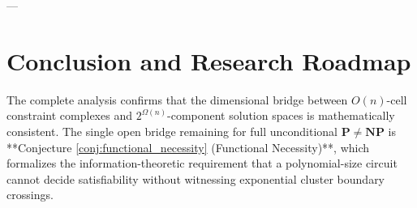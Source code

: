 \documentclass[11pt,a4paper]{article}
\theoremstyle{plain}
\theoremstyle{definition}
\theoremstyle{remark}
\begin{document}
---

\section{Conclusion and Research Roadmap}

The complete analysis confirms that the dimensional bridge between $O(n)$-cell constraint complexes and $2^{\Omega(n)}$-component solution spaces is mathematically consistent. The single open bridge remaining for full unconditional $\mathbf{P} \neq \mathbf{NP}$ is **Conjecture \ref{conj:functional_necessity} (Functional Necessity)**, which formalizes the information-theoretic requirement that a polynomial-size circuit cannot decide satisfiability without witnessing exponential cluster boundary crossings.
\end{document}
